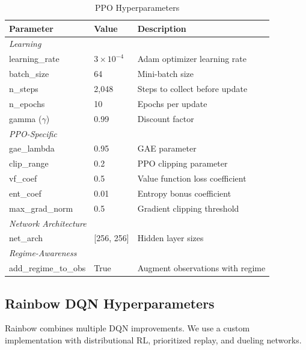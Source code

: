 \documentclass[11pt,a4paper]{article}
\begin{document}
\begin{table}[H]
\centering
\caption{PPO Hyperparameters}
\label{tab:ppo-params}
\begin{tabular}{lll}
\toprule
\textbf{Parameter} & \textbf{Value} & \textbf{Description} \\
\midrule
\multicolumn{3}{l}{\textit{Learning}} \\
learning\_rate & $3 \times 10^{-4}$ & Adam optimizer learning rate \\
batch\_size & 64 & Mini-batch size \\
n\_steps & 2,048 & Steps to collect before update \\
n\_epochs & 10 & Epochs per update \\
gamma ($\gamma$) & 0.99 & Discount factor \\
\midrule
\multicolumn{3}{l}{\textit{PPO-Specific}} \\
gae\_lambda & 0.95 & GAE parameter \\
clip\_range & 0.2 & PPO clipping parameter \\
vf\_coef & 0.5 & Value function loss coefficient \\
ent\_coef & 0.01 & Entropy bonus coefficient \\
max\_grad\_norm & 0.5 & Gradient clipping threshold \\
\midrule
\multicolumn{3}{l}{\textit{Network Architecture}} \\
net\_arch & [256, 256] & Hidden layer sizes \\
\midrule
\multicolumn{3}{l}{\textit{Regime-Awareness}} \\
add\_regime\_to\_obs & True & Augment observations with regime \\
\bottomrule
\end{tabular}
\end{table}

\subsection{Rainbow DQN Hyperparameters}

Rainbow combines multiple DQN improvements. We use a custom implementation with distributional RL, prioritized replay, and dueling networks.
\end{document}
